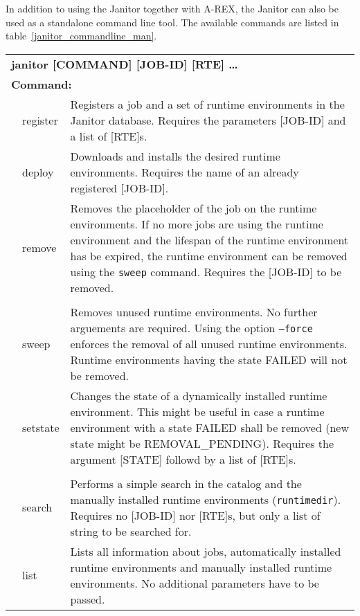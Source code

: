 In addition to using the Janitor together with A-REX,
the Janitor can also be used as a standalone command line tool.
The available commands are listed in table~\ref{janitor_commandline_man}.
\begin{table}[!h]
   \begin{center}
        \label{tab:janitor_commandline_man}
	\begin{tabular}{p{0.5cm}p{2cm}p{11cm}}
	\multicolumn{3}{l}{\textbf{janitor [COMMAND] [JOB-ID] [RTE] \dots}} \\
	\multicolumn{3}{l}{\textbf{Command:}}\\
	&	register	& Registers a job and a set of runtime environments in the Janitor database.
				  Requires the parameters [JOB-ID] and a list of [RTE]s.\\
	&	deploy		& Downloads and installs the desired runtime environments.
				  Requires the name of an already registered [JOB-ID].\\
	&	remove		& Removes the placeholder of the job on the runtime environments.
				  If no more jobs are using the runtime environment and the
				  lifespan of the runtime environment has be expired, the runtime
				  environment can be removed using the \texttt{sweep} command.
				  Requires the [JOB-ID] to be removed.\\
	&			&\\
	&	sweep		& Removes unused runtime environments. No further arguements are required.
				  Using the option \texttt{--force} enforces the removal of all unused
				  runtime environments. Runtime environments having the state FAILED will
				  not be removed.\\
	&	setstate	& Changes the state of a dynamically installed runtime environment.
				  This might be useful in case a runtime environment with a state FAILED
				  shall be removed (new state might be REMOVAL\_PENDING). Requires the argument
				  [STATE] followd by a list of [RTE]s.\\
	&			&\\
	&	search		& Performs a simple search in the catalog and the manually installed
				  runtime environments (\texttt{runtimedir}). Requires no [JOB-ID] nor [RTE]s,
				  but only a list of string to be searched for.\\
	&	list		& Lists all information about jobs, automatically installed runtime
				  environments and manually installed runtime environments.
				  No additional parameters have to be passed.\\

\end{tabular}
\end{center}
\end{table}
